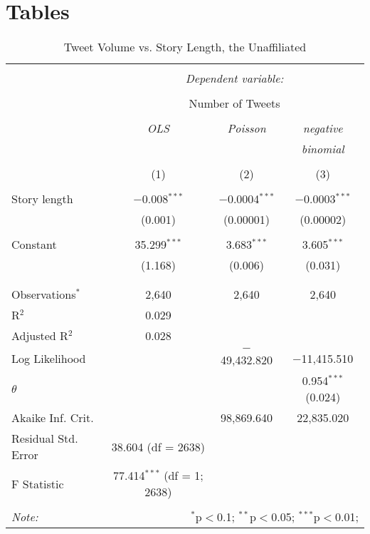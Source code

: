 \chapter{Tables}
\begin{table}[!htbp] \centering 
  \caption{Tweet Volume vs. Story Length, the Unaffiliated} 
  \label{} 
    \begin{tabular}{@{\extracolsep{5pt}}lccc} 
    \\[-1.8ex]\hline 
    \hline \\[-1.8ex] 
     & \multicolumn{3}{c}{\textit{Dependent variable:}} \\ 
    \cline{2-4} 
    \\[-1.8ex] & \multicolumn{3}{c}{Number of Tweets} \\ 
    \\[-1.8ex] & \textit{OLS} & \textit{Poisson} & \textit{negative} \\ 
     & \textit{} & \textit{} & \textit{binomial} \\ 
    \\[-1.8ex] & (1) & (2) & (3)\\ 
    \hline \\[-1.8ex] 
     Story length & $-$0.008$^{***}$ & $-$0.0004$^{***}$ & $-$0.0003$^{***}$ \\ 
      & (0.001) & (0.00001) & (0.00002) \\ 
      & & & \\ 
     Constant & 35.299$^{***}$ & 3.683$^{***}$ & 3.605$^{***}$ \\ 
      & (1.168) & (0.006) & (0.031) \\ 
      & & & \\ 
    \hline \\[-1.8ex] 
    Observations$^{*}$ & 2,640 & 2,640 & 2,640 \\ 
    R$^{2}$ & 0.029 &  &  \\ 
    Adjusted R$^{2}$ & 0.028 &  &  \\ 
    Log Likelihood &  & $-$49,432.820 & $-$11,415.510 \\ 
    $\theta$ &  &  & 0.954$^{***}$  (0.024) \\ 
    Akaike Inf. Crit. &  & 98,869.640 & 22,835.020 \\ 
    Residual Std. Error & 38.604 (df = 2638) &  &  \\ 
    F Statistic & 77.414$^{***}$ (df = 1; 2638) &  &  \\ 
    \hline 
    \hline \\[-1.8ex] 
    \textit{Note:}  & \multicolumn{3}{r}{$^{*}$p$<$0.1; $^{**}$p$<$0.05; $^{***}$p$<$0.01;} \\  
    \end{tabular}   
\end{table} 
